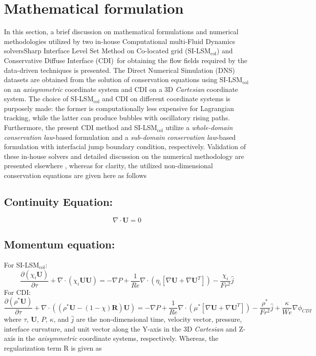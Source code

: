 \documentclass[a4paper,fleqn]{cas-sc}
\begin{document}
	
	\section{Mathematical formulation}
	\label{Mathematical formulation}
	In this section, a brief discussion on mathematical formulations and numerical methodologies utilized by two in-house Computational multi-Fluid Dynamics solvers\textemdash Sharp Interface Level Set Method on Co-located grid (SI-LSM$_{\text{col}}$) \cite{Chirammel2023} and Conservative Diffuse Interface (CDI)~\cite{Jain2020}\textemdash for obtaining the flow fields required by the data-driven techniques is presented.  The Direct Numerical Simulation (DNS) datasets are obtained from the solution of conservation equations using SI-LSM$_{\text{col}}$ on an \textit{axisymmetric} coordinate system and CDI on a 3D \textit{Cartesian} coordinate system. The choice of SI-LSM$_{\text{col}}$ and CDI on different coordinate systems is purposely made: the former is computationally less expensive for Lagrangian tracking, while the latter can produce bubbles with oscillatory rising paths. Furthermore, the present CDI method and SI-LSM$_{\text{col}}$ utilize a \textit{whole-domain conservation law}-based formulation and a \textit{sub-domain conservation law}-based formulation with interfacial jump boundary condition, respectively. Validation of these in-house solvers and detailed discussion on the numerical methodology are presented elsewhere \cite{Chirammel2023, Salimi2025}, whereas for clarity, the utilized non-dimensional conservation equations are given here as follows
	\subsection*{Continuity Equation:}
	\begin{equation}\label{eqt:continuity}
		\nabla\cdot\mathbf{U}=0
	\end{equation}
	\subsection*{Momentum equation:}
	\noindent For SI-LSM$_{\text{col}}$:
	\begin{equation}\label{eqt:momEqt-SI}
		\frac{\partial(\chi_{i}\mathbf{U})}{\partial\tau}+\nabla\cdot(\chi_{i}\mathbf{U}\mathbf{U})=-\nabla P+\frac{1}{Re}\nabla\cdot(\eta_{i}[\nabla\mathbf{U}+\nabla\mathbf{U}^T])-\frac{\chi_{i}}{Fr^2}\hat{j}
	\end{equation}
	\noindent For CDI:
	\begin{equation}\label{eqt:UnifiedMomentumEquation-Conservation}
		\frac{\partial(\rho^{*}\mathbf{U})}{\partial\tau}+\nabla\cdot((\rho^*\mathbf{U}-(1-\chi)\mathbf{R})\mathbf{U})=-\nabla P+\frac{1}{Re}\nabla\cdot(\mu^{*}[\nabla\mathbf{U}+\nabla\mathbf{U}^T])-\frac{\rho^*}{Fr^2}\hat{j}+\frac{\kappa}{We}\nabla \phi_{CDI}
	\end{equation}
	where $\tau$, $\mathbf{U}$, $P$, $\kappa$, and $\hat{j}$ are the non-dimensional time, velocity vector, pressure, interface curvature, and unit vector along the Y-axis in the 3D \textit{Cartesian} and Z-axis in the \textit{axisymmetric} coordinate systems, respectively. Whereas, the regularization term R is given as
	
\end{document}
